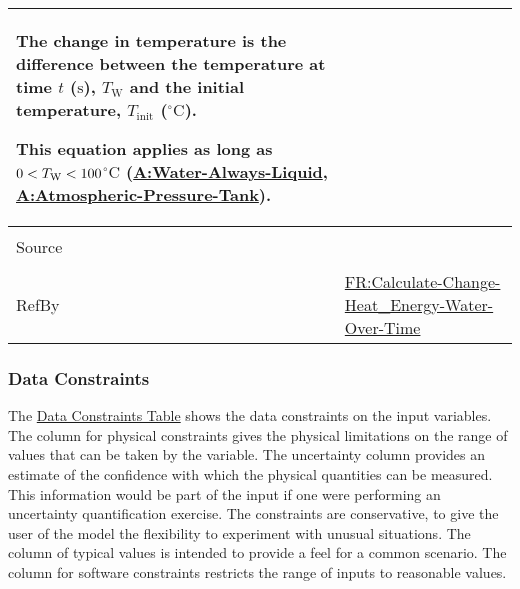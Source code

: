 \documentclass[12pt]{article}
\newcommand{\lt}{\ensuremath <}
\begin{document}
\begin{minipage}{\textwidth}
\begin{tabular}{>{\raggedright}p{}>{\raggedright\arraybackslash}p{}}
        The change in temperature is the difference between the temperature at time $t$ (${\text{s}}$), ${T_{\text{W}}}$ and the initial temperature, ${T_{\text{init}}}$ (${{}^{\circ}\text{C}}$).
        
        This equation applies as long as $0\lt{}{T_{\text{W}}}\lt{}100$${{}^{\circ}\text{C}}$ (\hyperref[assumpWAL]{A:Water-Always-Liquid}, \hyperref[assumpAPT]{A:Atmospheric-Pressure-Tank}).
        
\\ \midrule \\
Source & \cite{koothoor2013}
         
\\ \midrule \\
RefBy & \hyperref[calcChgHeatEnergyWtrOverTime]{FR:Calculate-Change-Heat\_Energy-Water-Over-Time}
        
\\ \bottomrule
\end{tabular}
\end{minipage}

\subsubsection{Data Constraints}
\label{Sec:DataConstraints}
The \hyperref[Table:InDataConstraints]{Data Constraints Table} shows the data constraints on the input variables. The column for physical constraints gives the physical limitations on the range of values that can be taken by the variable. The uncertainty column provides an estimate of the confidence with which the physical quantities can be measured. This information would be part of the input if one were performing an uncertainty quantification exercise. The constraints are conservative, to give the user of the model the flexibility to experiment with unusual situations. The column of typical values is intended to provide a feel for a common scenario. The column for software constraints restricts the range of inputs to reasonable values.
\end{document}

